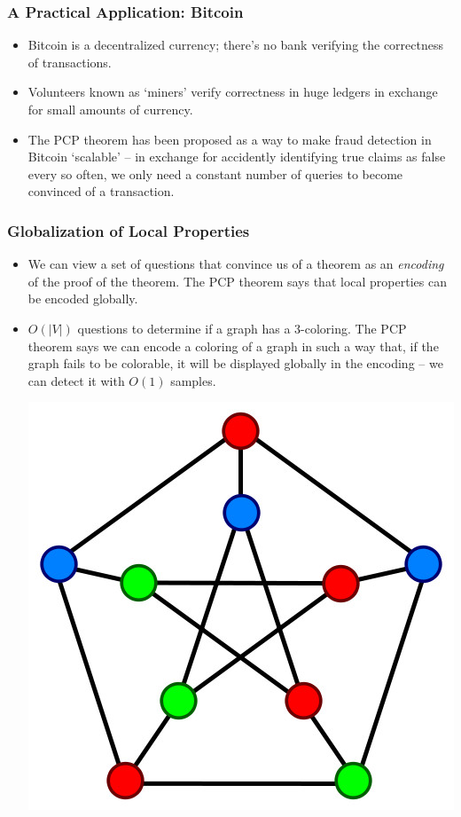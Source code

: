 \documentclass{beamer}
\begin{document}
\begin{frame}
    \frametitle{A Practical Application: Bitcoin}

    \begin{itemize}
        \item<1-> Bitcoin is a decentralized currency; there's no bank verifying the correctness of transactions.

        \item<2-> Volunteers known as `miners' verify correctness in huge ledgers in exchange for small amounts of currency.

        \item<3-> The PCP theorem has been proposed as a way to make fraud detection in Bitcoin `scalable' -- in exchange for accidently identifying true claims as false every so often, we only need a constant number of queries to become convinced of a transaction.
    \end{itemize}
\end{frame}

\begin{frame}
    \frametitle{Globalization of Local Properties}
    \begin{itemize}
        \item<1-> We can view a set of questions that convince us of a theorem as an {\it encoding} of the proof of the theorem. The PCP theorem says that local properties can be encoded globally.

        \item<2-> $O(|V|)$ questions to determine if a graph has a 3-coloring. The PCP theorem says we can encode a coloring of a graph in such a way that, if the graph fails to be colorable, it will be displayed globally in the encoding -- we can detect it with $O(1)$ samples.
        \begin{center}
        \includegraphics[scale=0.25]{3coloring.jpg}
    \end{center}
    \end{itemize}
\end{frame}
\end{document}
